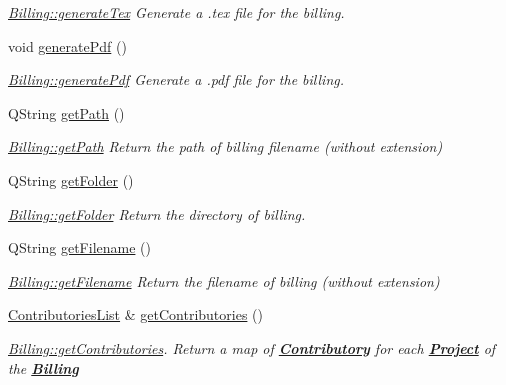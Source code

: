 \begin{DoxyCompactItemize}
\begin{DoxyCompactList}\small\item\em \hyperlink{classModels_1_1Billing_a3f835c6f4ea0b66c43bb7fec40c6e075}{Billing\-::generate\-Tex} Generate a .tex file for the billing. \end{DoxyCompactList}\item 
\hypertarget{classModels_1_1Billing_a27e273242564cdb68c14810a4580f8e5}{void \hyperlink{classModels_1_1Billing_a27e273242564cdb68c14810a4580f8e5}{generate\-Pdf} ()}\label{classModels_1_1Billing_a27e273242564cdb68c14810a4580f8e5}

\begin{DoxyCompactList}\small\item\em \hyperlink{classModels_1_1Billing_a27e273242564cdb68c14810a4580f8e5}{Billing\-::generate\-Pdf} Generate a .pdf file for the billing. \end{DoxyCompactList}\item 
Q\-String \hyperlink{classModels_1_1Billing_a4110ac32d8d96b9fbd1b0037df39723b}{get\-Path} ()
\begin{DoxyCompactList}\small\item\em \hyperlink{classModels_1_1Billing_a4110ac32d8d96b9fbd1b0037df39723b}{Billing\-::get\-Path} Return the path of billing filename (without extension) \end{DoxyCompactList}\item 
Q\-String \hyperlink{classModels_1_1Billing_a2359afe641ba85a37729fb0d951bff7d}{get\-Folder} ()
\begin{DoxyCompactList}\small\item\em \hyperlink{classModels_1_1Billing_a2359afe641ba85a37729fb0d951bff7d}{Billing\-::get\-Folder} Return the directory of billing. \end{DoxyCompactList}\item 
Q\-String \hyperlink{classModels_1_1Billing_ae8700d38ecd8e4975f1ee013144ed455}{get\-Filename} ()
\begin{DoxyCompactList}\small\item\em \hyperlink{classModels_1_1Billing_ae8700d38ecd8e4975f1ee013144ed455}{Billing\-::get\-Filename} Return the filename of billing (without extension) \end{DoxyCompactList}\item 
\hyperlink{classModels_1_1ContributoriesList}{Contributories\-List} \& \hyperlink{classModels_1_1Billing_af3d66c06d8c4d855b0efa5ff599a3ceb}{get\-Contributories} ()
\begin{DoxyCompactList}\small\item\em \hyperlink{classModels_1_1Billing_af3d66c06d8c4d855b0efa5ff599a3ceb}{Billing\-::get\-Contributories}. Return a map of {\bfseries \hyperlink{classModels_1_1Contributory}{Contributory}} for each {\bfseries \hyperlink{classModels_1_1Project}{Project}} of the {\bfseries \hyperlink{classModels_1_1Billing}{Billing}} \end{DoxyCompactList}\item 

\end{DoxyCompactItemize}
